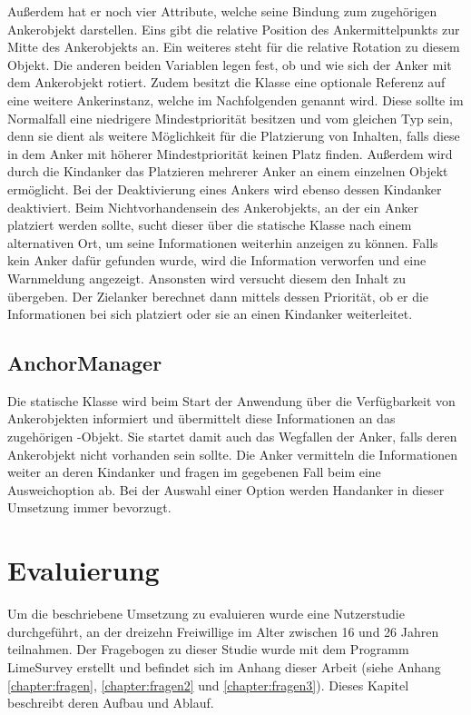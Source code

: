			Außerdem hat er noch vier Attribute, welche seine Bindung zum zugehörigen Ankerobjekt darstellen. Eins gibt die relative Position des Ankermittelpunkts zur Mitte des Ankerobjekts an. Ein weiteres steht für die relative Rotation zu diesem Objekt. Die anderen beiden Variablen legen fest, ob und wie sich der Anker mit dem Ankerobjekt rotiert.
			Zudem besitzt die Klasse eine optionale Referenz auf eine weitere Ankerinstanz, welche im Nachfolgenden  genannt wird. Diese sollte im Normalfall eine niedrigere Mindestpriorität besitzen und vom gleichen Typ sein, denn sie dient als weitere Möglichkeit für die Platzierung von Inhalten, falls diese in dem Anker mit höherer Mindestpriorität keinen Platz finden. Außerdem wird durch die Kindanker das Platzieren mehrerer Anker an einem einzelnen Objekt ermöglicht. Bei der Deaktivierung eines Ankers wird ebenso dessen Kindanker deaktiviert.
			Beim Nichtvorhandensein des Ankerobjekts, an der ein Anker platziert werden sollte, sucht dieser über die statische Klasse  nach einem alternativen Ort, um seine Informationen weiterhin anzeigen zu können.
			Falls kein Anker dafür gefunden wurde, wird die Information verworfen und eine Warnmeldung angezeigt. Ansonsten wird versucht diesem den Inhalt zu übergeben. Der Zielanker berechnet dann mittels dessen Priorität, ob er die Informationen bei sich platziert oder sie an einen Kindanker weiterleitet.
		
		\subsection{AnchorManager}
			Die statische Klasse  wird beim Start der Anwendung über die Verfügbarkeit von Ankerobjekten informiert und übermittelt diese Informationen an das zugehörigen -Objekt. Sie startet damit auch das Wegfallen der Anker, falls deren Ankerobjekt nicht vorhanden sein sollte. Die Anker vermitteln die Informationen weiter an deren Kindanker und fragen im gegebenen Fall beim  eine Ausweichoption ab. Bei der Auswahl einer Option werden Handanker in dieser Umsetzung immer bevorzugt.
			
	\section{Evaluierung}
		Um die beschriebene Umsetzung zu evaluieren wurde eine Nutzerstudie durchgeführt, an der dreizehn Freiwillige im Alter zwischen 16 und 26 Jahren teilnahmen. Der Fragebogen zu dieser Studie wurde mit dem Programm LimeSurvey erstellt und befindet sich im Anhang dieser Arbeit (siehe Anhang \ref{chapter:fragen}, \ref{chapter:fragen2} und \ref{chapter:fragen3}). Dieses Kapitel beschreibt deren Aufbau und Ablauf.
	
